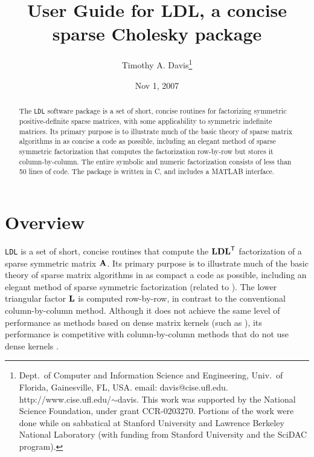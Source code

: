 \documentclass[12pt]{article}
\newcommand{\m}[1]{{\bf{#1}}}       %
\newcommand{\tr}{^{\sf T}}          %
\begin{document}

\title{User Guide for LDL, a concise sparse Cholesky package}
\author{Timothy A. Davis\thanks{
Dept.~of Computer and Information Science and Engineering,
Univ.~of Florida, Gainesville, FL, USA.
email: davis@cise.ufl.edu.
http://www.cise.ufl.edu/$\sim$davis.
This work was supported by the National
Science Foundation, under grant CCR-0203270.
Portions of the work were done while on sabbatical at Stanford University
and Lawrence Berkeley National Laboratory (with funding from Stanford
University and the SciDAC program).
}}

\date{Nov 1, 2007}

\maketitle

\begin{abstract}
The {\tt LDL} software package is a set of short, concise routines for
factorizing symmetric positive-definite sparse matrices, with some
applicability to symmetric indefinite matrices.  Its primary purpose is
to illustrate much of the basic theory of sparse matrix algorithms in as
concise a code as possible, including an elegant method
of sparse symmetric factorization that computes the factorization row-by-row
but stores it column-by-column.  The entire symbolic and numeric factorization
consists of less than 50 lines of code.  The package is written in C,
and includes a MATLAB interface.
\end{abstract}

\section{Overview}

{\tt LDL} is a set of short, concise routines that compute the $\m{LDL}\tr$
factorization of a sparse symmetric matrix $\m{A}$.  Its primary purpose is
to illustrate much of the basic theory of sparse matrix algorithms in as
compact a code as possible, including an elegant method of
sparse symmetric factorization (related to \cite{Liu86c,Liu91}).
The lower triangular factor $\m{L}$ is computed row-by-row, in contrast to the
conventional column-by-column method.
Although it does not achieve the same level of performance
as methods based on dense matrix kernels
(such as \cite{NgPeyton93,RothbergGupta91}),
its performance is competitive with column-by-column methods that do not
use dense kernels \cite{GeorgeLiu79, GeorgeLiu, GilbertMolerSchreiber}.
\end{document}
